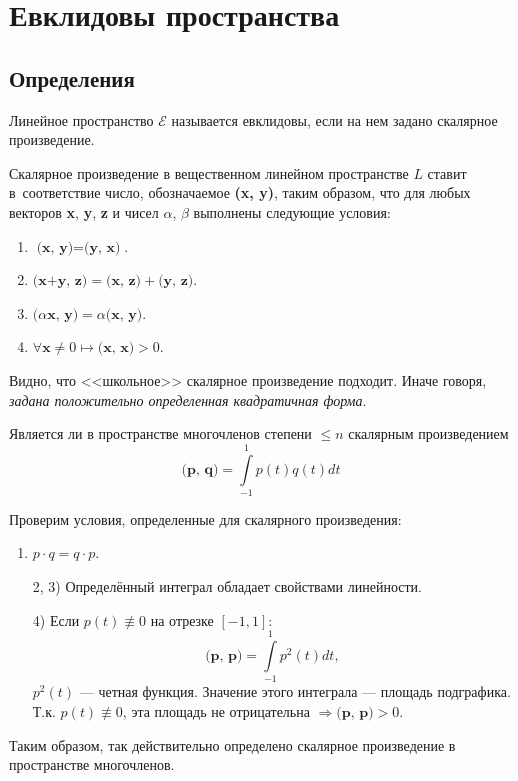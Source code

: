 \section{Евклидовы пространства}
\subsection{Определения}
\begin{definition}
Линейное пространство $\mathcal{E}$ называется евклидовы, если на нем задано скалярное произведение.
\end{definition}
\begin{definition}
Скалярное произведение в вещественном линейном пространстве $L$ ставит в~соответствие число, обозначаемое \textbf{(x, y)}, таким образом, что для любых векторов \textbf{x}, \textbf{y}, \textbf{z} и чисел $\alpha$, $\beta$ выполнены следующие условия:
\renewcommand{\labelenumi}{\theenumi)}
\begin{enumerate}
	\item $\textbf{(x, y)} = \textbf{(y, x)}$.
	\item $\textbf{(x+y, z)} = \textbf{(x, z)}+\textbf{(y, z)}$.
	\item $\textbf{(}\alpha\textbf{x, y)} = \alpha \textbf{(x, y)}$.
	\item $\forall \textbf{x}\neq0 \longmapsto \textbf{(x, x)} > 0$.
\end{enumerate}
\end{definition}
Видно, что <<школьное>> скалярное произведение подходит.
Иначе говоря, \emph{задана положительно определенная квадратичная форма}.
\begin{prim}
Является ли в пространстве многочленов степени $ \leq n $ скалярным произведением
$$
\textbf{(p, q)} = \int\limits_{-1}^{1} p(t)q(t)dt
$$
\end{prim}
Проверим условия, определенные для скалярного произведения:
\renewcommand{\labelenumi}{\theenumi)}
\begin{enumerate}
	\item $p\cdot q=q\cdot p$.
	\item[2, 3)] Определённый интеграл обладает свойствами линейности.
	\item[4)] Если $p(t) \not\equiv 0 $ на отрезке $ [-1, 1] $:
	$$
	\textbf{(p, p)} = \int\limits_{-1}^{1}p^2(t)dt,
	$$
	$ p^2(t) $ --- четная функция. Значение этого интеграла --- площадь подграфика. Т.к. $ p(t) \not\equiv 0 $, эта площадь не отрицательна $ \Rightarrow \textbf{(p, p)}>0 $.
\end{enumerate}
Таким образом, так действительно определено скалярное произведение в пространстве многочленов.
